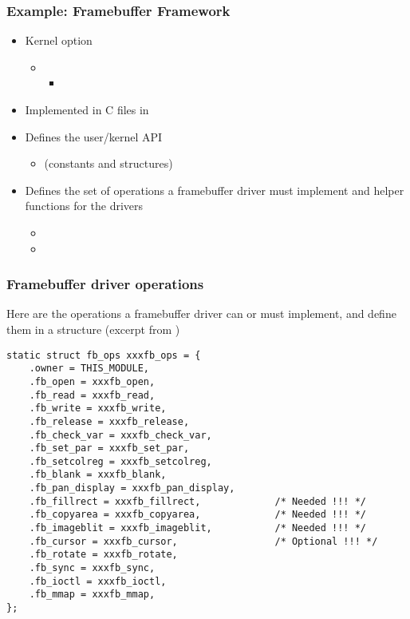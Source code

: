 \begin{frame}
  \frametitle{Example: Framebuffer Framework}
  \begin{itemize}
  \item Kernel option 
    \begin{itemize}
    \item {}
      \begin{itemize}
      \item {}
      \end{itemize}
    \end{itemize}
  \item Implemented in C files in 
  \item Defines the user/kernel API
    \begin{itemize}
    \item {} (constants and structures)
    \end{itemize}
  \item Defines the set of operations a framebuffer driver must
    implement and helper functions for the drivers
    \begin{itemize}
    \item {}
    \item {}
    \end{itemize}
  \end{itemize}
\end{frame}

\begin{frame}[fragile]
  \frametitle{Framebuffer driver operations}
  \small Here are the operations a framebuffer driver can or must
  implement, and define them in a  structure
  (excerpt from )
  \footnotesize
  \begin{verbatim}
static struct fb_ops xxxfb_ops = {
    .owner = THIS_MODULE,
    .fb_open = xxxfb_open,
    .fb_read = xxxfb_read,
    .fb_write = xxxfb_write,
    .fb_release = xxxfb_release,
    .fb_check_var = xxxfb_check_var,
    .fb_set_par = xxxfb_set_par,
    .fb_setcolreg = xxxfb_setcolreg,
    .fb_blank = xxxfb_blank,
    .fb_pan_display = xxxfb_pan_display,
    .fb_fillrect = xxxfb_fillrect,             /* Needed !!! */
    .fb_copyarea = xxxfb_copyarea,             /* Needed !!! */
    .fb_imageblit = xxxfb_imageblit,           /* Needed !!! */
    .fb_cursor = xxxfb_cursor,                 /* Optional !!! */
    .fb_rotate = xxxfb_rotate,
    .fb_sync = xxxfb_sync,
    .fb_ioctl = xxxfb_ioctl,
    .fb_mmap = xxxfb_mmap,
};
  \end{verbatim}
\end{frame}

